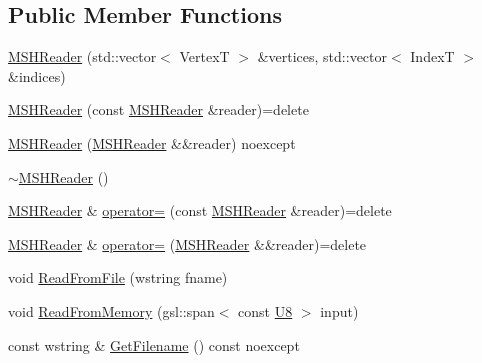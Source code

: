 \subsection*{Public Member Functions}
\begin{DoxyCompactItemize}
\item 
\mbox{\hyperlink{classmage_1_1rendering_1_1loader_1_1_m_s_h_reader_adf50a71f368cd580433b3dab5ea3a1ac}{M\+S\+H\+Reader}} (std\+::vector$<$ VertexT $>$ \&vertices, std\+::vector$<$ IndexT $>$ \&indices)
\item 
\mbox{\hyperlink{classmage_1_1rendering_1_1loader_1_1_m_s_h_reader_ae16a36afbfe65791cdfe8dadd6b57af2}{M\+S\+H\+Reader}} (const \mbox{\hyperlink{classmage_1_1rendering_1_1loader_1_1_m_s_h_reader}{M\+S\+H\+Reader}} \&reader)=delete
\item 
\mbox{\hyperlink{classmage_1_1rendering_1_1loader_1_1_m_s_h_reader_a107ac854c231c1a1c39f30c5199dcec7}{M\+S\+H\+Reader}} (\mbox{\hyperlink{classmage_1_1rendering_1_1loader_1_1_m_s_h_reader}{M\+S\+H\+Reader}} \&\&reader) noexcept
\item 
\mbox{\hyperlink{classmage_1_1rendering_1_1loader_1_1_m_s_h_reader_af45daf383d4e94586b5d2968d5357fce}{$\sim$\+M\+S\+H\+Reader}} ()
\item 
\mbox{\hyperlink{classmage_1_1rendering_1_1loader_1_1_m_s_h_reader}{M\+S\+H\+Reader}} \& \mbox{\hyperlink{classmage_1_1rendering_1_1loader_1_1_m_s_h_reader_a106e5a6cce46777cf7ae36cb4034e1a0}{operator=}} (const \mbox{\hyperlink{classmage_1_1rendering_1_1loader_1_1_m_s_h_reader}{M\+S\+H\+Reader}} \&reader)=delete
\item 
\mbox{\hyperlink{classmage_1_1rendering_1_1loader_1_1_m_s_h_reader}{M\+S\+H\+Reader}} \& \mbox{\hyperlink{classmage_1_1rendering_1_1loader_1_1_m_s_h_reader_a8764164f7e0f78938c5e303d13e0f64d}{operator=}} (\mbox{\hyperlink{classmage_1_1rendering_1_1loader_1_1_m_s_h_reader}{M\+S\+H\+Reader}} \&\&reader)=delete
\item 
void \mbox{\hyperlink{classmage_1_1rendering_1_1loader_1_1_m_s_h_reader_a68db676feaa42c1c3a9bf16d0680b04f}{Read\+From\+File}} (wstring fname)
\item 
void \mbox{\hyperlink{classmage_1_1rendering_1_1loader_1_1_m_s_h_reader_afc48490dca5042078726a1ec3fe7abe7}{Read\+From\+Memory}} (gsl\+::span$<$ const \mbox{\hyperlink{namespacemage_afc638980bc6154f15af5e2d93a0e0ea9}{U8}} $>$ input)
\item 
const wstring \& \mbox{\hyperlink{classmage_1_1rendering_1_1loader_1_1_m_s_h_reader_a801558f27606dbc681809178aaaaacd1}{Get\+Filename}} () const noexcept
\end{DoxyCompactItemize}
